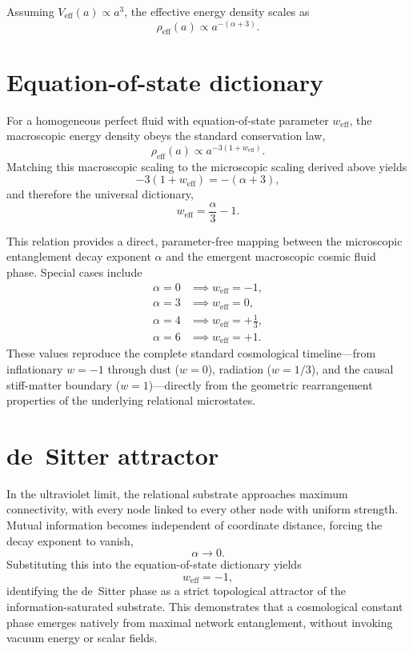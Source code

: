 \documentclass[aps,prd,onecolumn,nofootinbib,preprint]{revtex4-2}
\begin{document}
Assuming $V_{\mathrm{eff}}(a) \propto a^3$, the effective energy density scales as
\begin{equation}
\rho_{\mathrm{eff}}(a) \propto a^{-(\alpha+3)}.
\end{equation}

\section{Equation-of-state dictionary}

For a homogeneous perfect fluid with equation-of-state parameter $w_{\mathrm{eff}}$, the macroscopic
energy density obeys the standard conservation law,
\begin{equation}
\rho_{\mathrm{eff}}(a) \propto a^{-3(1+w_{\mathrm{eff}})}.
\end{equation}
Matching this macroscopic scaling to the microscopic scaling derived above yields
\begin{equation}
-3(1+w_{\mathrm{eff}}) = -(\alpha + 3),
\end{equation}
and therefore the universal dictionary,
\begin{equation}
w_{\mathrm{eff}} = \frac{\alpha}{3} - 1.
\end{equation}

This relation provides a direct, parameter-free mapping between the microscopic entanglement
decay exponent $\alpha$ and the emergent macroscopic cosmic fluid phase. Special cases include
\begin{align}
\alpha = 0 &\implies w_{\mathrm{eff}} = -1, \\
\alpha = 3 &\implies w_{\mathrm{eff}} = 0, \\
\alpha = 4 &\implies w_{\mathrm{eff}} = +\frac{1}{3}, \\
\alpha = 6 &\implies w_{\mathrm{eff}} = +1.
\end{align}
These values reproduce the complete standard cosmological timeline---from inflationary
$w=-1$ through dust ($w=0$), radiation ($w=1/3$), and the causal stiff-matter boundary
($w=1$)---directly from the geometric rearrangement properties of the underlying relational
microstates.

\section{de~Sitter attractor}

In the ultraviolet limit, the relational substrate approaches maximum connectivity, with every node
linked to every other node with uniform strength. Mutual information becomes independent of
coordinate distance, forcing the decay exponent to vanish,
\begin{equation}
\alpha \to 0.
\end{equation}
Substituting this into the equation-of-state dictionary yields
\begin{equation}
w_{\mathrm{eff}} = -1,
\end{equation}
identifying the de~Sitter phase as a strict topological attractor of the information-saturated
substrate. This demonstrates that a cosmological constant phase emerges natively from maximal
network entanglement, without invoking vacuum energy or scalar fields.
\end{document}
